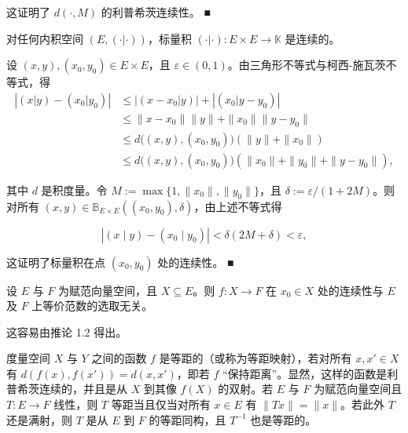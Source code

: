 \begin{example}
这证明了 $ d(\cdot, M) $ 的利普希茨连续性。 ■

\begin{items}
\item[（m）]

对任何内积空间 $ (E, (\cdot|\cdot)) $，标量积 $ (\cdot|\cdot): E \times E \to \mathbb{K} $ 是连续的。

\proofhead
设 $ (x, y), (x_0, y_0) \in E \times E $，且 $ \varepsilon \in (0, 1) $。由三角形不等式与柯西-施瓦茨不等式，得
\begin{equation*}
\begin{aligned}
\left|(x|y)-(x_{0}|y_{0})\right|&\leq\left|(x-x_{0}|y)\right|+\left|(x_{0}|y-y_{0})\right|\\&\leq\|x-x_{0}\|\|y\|+\|x_{0}\|\|y-y_{0}\|\\&\leq d\big((x,y),(x_{0},y_{0})\big)\left(\|y\|+\|x_{0}\|\right)\\&\leq d\big((x,y),(x_{0},y_{0})\big)\left(\|x_{0}\|+\|y_{0}\|+\|y-y_{0}\|\right),
\end{aligned}
\end{equation*}

其中 $d$ 是积度量。令 $M := \max\{1, \|x_0\|, \|y_0\|\}$，且 $\delta := \varepsilon/(1 + 2M)$。则对所有 $(x, y) \in \mathbb{B}_{E \times E}((x_0, y_0), \delta)$，由上述不等式得

\[
\left|\left(x\mid y\right)-\left(x_{0}\mid y_{0}\right)\right|<\delta(2M+\delta)<\varepsilon,
\]

这证明了标量积在点 $ (x_{0}, y_{0}) $ 处的连续性。 ■

\item[（n）]

设 $E$ 与 $F$ 为赋范向量空间，且 $X \subseteq E$。则 $f: X \to F$ 在 $x_0 \in X$ 处的连续性与 $E$ 及 $F$ 上等价范数的选取无关。

\proofhead
这容易由推论 1.2 得出。
\item[（o）]

度量空间 $X$ 与 $Y$ 之间的函数 $f$ 是等距的（或称为等距映射），若对所有 $x, x' \in X$ 有 $d(f(x), f(x')) = d(x, x')$，即若 $f$ “保持距离”。显然，这样的函数是利普希茨连续的，并且是从 $X$ 到其像 $f(X)$ 的双射。若 $E$ 与 $F$ 为赋范向量空间且 $T: E \to F$ 线性，则 $T$ 等距当且仅当对所有 $x \in E$ 有 $\|Tx\| = \|x\|$。若此外 $T$ 还是满射，则 $T$ 是从 $E$ 到 $F$ 的等距同构，且 $T^{-1}$ 也是等距的。

\end{items}

\end{example}

